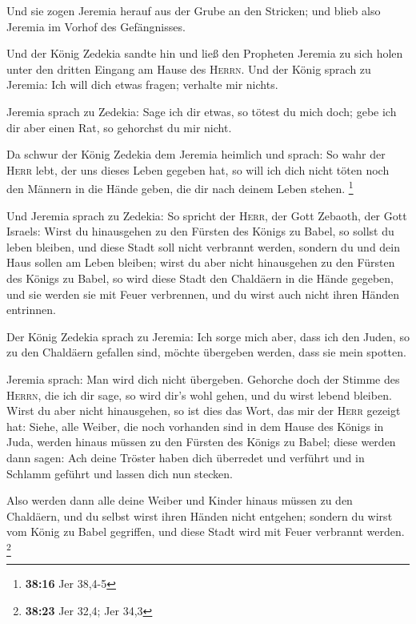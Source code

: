 Und sie zogen Jeremia herauf aus der Grube an den
Stricken; und blieb also Jeremia im Vorhof des Gefängnisses.

 Und der König Zedekia sandte hin und ließ den Propheten
Jeremia zu sich holen unter den dritten Eingang am Hause des
\textsc{Herrn}. Und der König sprach zu Jeremia: Ich will dich etwas
fragen; verhalte mir nichts.

 Jeremia sprach zu Zedekia: Sage ich dir etwas, so tötest
du mich doch; gebe ich dir aber einen Rat, so gehorchst du mir nicht.

 Da schwur der König Zedekia dem Jeremia heimlich und
sprach: So wahr der \textsc{Herr} lebt, der uns dieses Leben gegeben
hat, so will ich dich nicht töten noch den Männern in die Hände geben,
die dir nach deinem Leben stehen. \footnote{\textbf{38:16} Jer 38,4-5}

 Und Jeremia sprach zu Zedekia: So spricht der
\textsc{Herr}, der Gott Zebaoth, der Gott Israels: Wirst du hinausgehen
zu den Fürsten des Königs zu Babel, so sollst du leben bleiben, und
diese Stadt soll nicht verbrannt werden, sondern du und dein Haus sollen
am Leben bleiben;  wirst du aber nicht hinausgehen zu den
Fürsten des Königs zu Babel, so wird diese Stadt den Chaldäern in die
Hände gegeben, und sie werden sie mit Feuer verbrennen, und du wirst
auch nicht ihren Händen entrinnen.

 Der König Zedekia sprach zu Jeremia: Ich sorge mich
aber, dass ich den Juden, so zu den Chaldäern gefallen sind, möchte
übergeben werden, dass sie mein spotten.

 Jeremia sprach: Man wird dich nicht übergeben. Gehorche
doch der Stimme des \textsc{Herrn}, die ich dir sage, so wird dir's wohl
gehen, und du wirst lebend bleiben.  Wirst du aber nicht
hinausgehen, so ist dies das Wort, das mir der \textsc{Herr} gezeigt
hat:  Siehe, alle Weiber, die noch vorhanden sind in dem
Hause des Königs in Juda, werden hinaus müssen zu den Fürsten des Königs
zu Babel; diese werden dann sagen: Ach deine Tröster haben dich
überredet und verführt und in Schlamm geführt und lassen dich nun
stecken.

 Also werden dann alle deine Weiber und Kinder hinaus
müssen zu den Chaldäern, und du selbst wirst ihren Händen nicht
entgehen; sondern du wirst vom König zu Babel gegriffen, und diese Stadt
wird mit Feuer verbrannt werden. \footnote{\textbf{38:23} Jer 32,4; Jer
  34,3}

